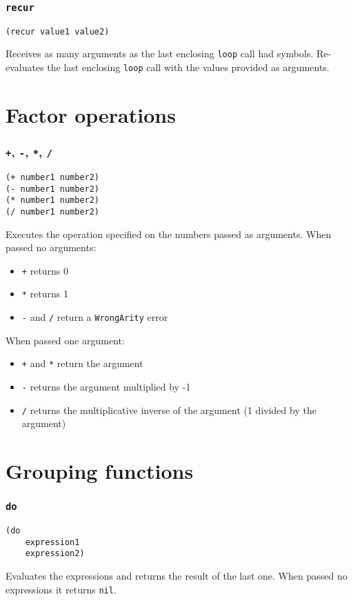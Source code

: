 \documentclass[11pt]{scrreprt}
\begin{document}
\subsubsection{\texttt{recur}}
\begin{verbatim}
(recur value1 value2)
\end{verbatim}
Receives as many arguments as the last enclosing \texttt{loop} call had symbols. Re-evaluates the last enclosing \texttt{loop} call with the values provided as arguments.


\section{Factor operations}
\label{FactorOp}
\subsubsection{\texttt{+}, \texttt{-}, \texttt{*}, \texttt{/}}
\begin{verbatim}
(+ number1 number2)
(- number1 number2)
(* number1 number2)
(/ number1 number2)
\end{verbatim}
Executes the operation specified on the numbers passed as arguments. When passed no arguments:
\begin{itemize}
    \item \texttt{+} returns 0
    \item \texttt{*} returns 1
    \item \texttt{-} and \texttt{/} return a \texttt{WrongArity} error
\end{itemize}
When passed one argument:
\begin{itemize}
    \item \texttt{+} and \texttt{*} return the argument
    \item \texttt{-} returns the argument multiplied by -1
    \item \texttt{/} returns the multiplicative inverse of the argument (1 divided by the argument)
\end{itemize}


\section{Grouping functions}
\subsubsection{\texttt{do}}
\begin{verbatim}
(do
    expression1
    expression2)
\end{verbatim}
Evaluates the expressions and returns the result of the last one. When passed no expressions it returns \texttt{nil}.
\end{document}
